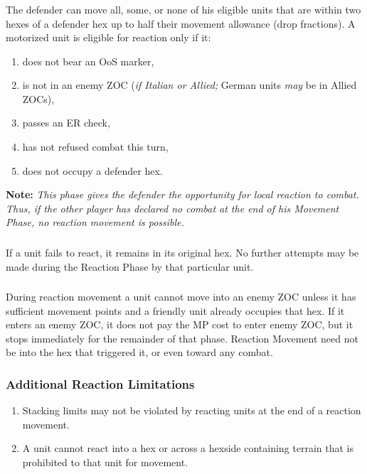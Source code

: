 \subsubsection{}
The defender can move all, some, or none of his eligible units that are within two hexes of a defender hex up to half their movement allowance (drop fractions). A motorized unit is eligible for reaction only if it:
\begin{enumerate}[label=\alph*.]
    \item does not bear an OoS marker,
    \item is not in an enemy ZOC (\textit{if Italian or Allied;} German units \textit{may} be in Allied ZOCs),
    \item passes an ER check,
    \item has not refused combat this turn,
    \item does not occupy a defender hex.
\end{enumerate}

\textbf{Note:} \textit{This phase gives the defender the opportunity for local reaction to combat. Thus, if the other player has declared no combat at the end of his Movement Phase, no reaction movement is possible.}

\subsubsection{}
If a unit fails to react, it remains in its original hex. No further attempts may be made during the Reaction Phase by that particular unit.

\subsubsection{}
During reaction movement a unit cannot move into an enemy ZOC unless it has sufficient movement points and a friendly unit already occupies that hex. If it enters an enemy ZOC, it does not pay the MP cost to enter enemy ZOC, but it stops immediately for the remainder of that phase. Reaction Movement need not be into the hex that triggered it, or even toward any combat.

\subsubsection{\textbf{Additional Reaction Limitations}}
\begin{enumerate}[label=\alph*.]
    \item Stacking limits may not be violated by reacting units at the end of a reaction movement.
    \item A unit cannot react into a hex or across a hexside containing terrain that is prohibited to that unit for movement.
\end{enumerate}